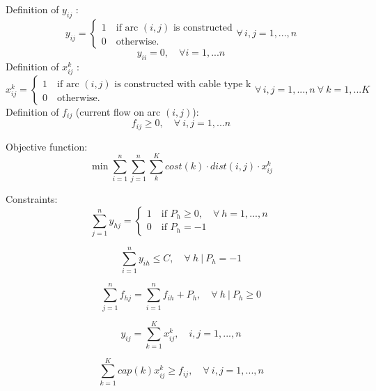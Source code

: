 Definition of $y_{ij}$ :
\[
	y_{ij} =
   \begin{cases}
   1 \quad \mbox{if arc } (i,j) \mbox{ is constructed} \\
   0 \quad \mbox{otherwise.} 
   \end{cases}
   \forall \,i,j = 1, ..., n 
\]
\[
	y_{ii} = 0, \quad \forall i= 1, ... n 
\]
Definition of $x^k_{ij}$ :
\[
	x^k_{ij} =
   \begin{cases}
   1 \quad \mbox{if arc } (i,j) \mbox{ is constructed with cable type k} \\
   0 \quad \mbox{otherwise.} 
   \end{cases}
   \forall \,i,j = 1, ..., n \ \forall \ k = 1,... K
\]
Definition of $f_{ij}$ (current flow on arc $(i,j)$):
\[
	f_{ij} \geq 0, \quad \forall \ i,j= 1, ... n
\]

Objective function: 
\begin{equation}\label{eq:obj}
	\min{\sum^n_{i=1} \sum^n_{j=1} \sum^K_{k} cost(k) \cdot dist(i,j) \cdot x^k_{ij}}
\end{equation}

Constraints: 
\begin{equation}\label{eq:numberCable}
	\sum^n_{j = 1} y_{hj} = 
	\begin{cases}
   1 \quad \mbox{if } P_h \geq 0, \quad \forall \ h=1,...,n \\
   0 \quad \mbox{if } P_h = -1
   \end{cases}
\end{equation}

\begin{equation}\label{eq:basestation}
	\sum^n_{i =1} y_{ih} \leq C, \quad \forall \ h \ | \ P_h = -1
\end{equation}

\begin{equation}\label{eq:flux}
	\sum^n_{j=1} f_{hj} = \sum^n_{i=1} f_{ih}+ P_h, \quad \forall \ h \ | \ P_h \geq 0
\end{equation}

\begin{equation}\label{eq:oneCable}
	y_{ij} = \sum^K_{k=1} x^k_{ij}, \quad i,j = 1,...,n
\end{equation}

\begin{equation}\label{eq:capacity}
	\sum^K_{k=1} cap(k)x^k_{ij} \geq f_{ij}, \quad \forall \ i,j = 1,...,n
\end{equation}

